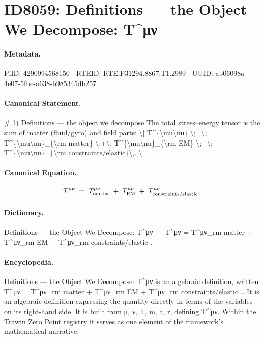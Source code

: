 \section*{ID8059: Definitions — the Object We Decompose: T\textasciicircum{}μν}
\paragraph{Metadata.}
PiID: 4290994568150 | RTEID: RTE:P31294.8867:T1.2989 | UUID: ab06098a-4e07-5fbe-a638-b985345db257

\paragraph{Canonical Statement.}
\# 1) Definitions — the object we decompose The total stress–energy tensor is the sum of matter (fluid/gyro) and field parts: \textbackslash{}[ T\textasciicircum{}\{\textbackslash{}mu\textbackslash{}nu\} \textbackslash{};=\textbackslash{}; T\textasciicircum{}\{\textbackslash{}mu\textbackslash{}nu\}\_\{\textbackslash{}rm matter\} \textbackslash{};+\textbackslash{}; T\textasciicircum{}\{\textbackslash{}mu\textbackslash{}nu\}\_\{\textbackslash{}rm EM\} \textbackslash{};+\textbackslash{}; T\textasciicircum{}\{\textbackslash{}mu\textbackslash{}nu\}\_\{\textbackslash{}rm constraints/elastic\}\textbackslash{},. \textbackslash{}]

\paragraph{Canonical Equation.}
\[
T^{\mu\nu} \;=\; T^{\mu\nu}_{\rm matter} \;+\; T^{\mu\nu}_{\rm EM} \;+\; T^{\mu\nu}_{\rm constraints/elastic}\,.
\]

\paragraph{Dictionary.}
Definitions — the Object We Decompose: T\textasciicircum{}μν — T\textasciicircum{}μν = T\textasciicircum{}μν\_rm matter + T\textasciicircum{}μν\_rm EM + T\textasciicircum{}μν\_rm constraints/elastic .

\paragraph{Encyclopedia.}
Definitions — the Object We Decompose: T\textasciicircum{}μν is an algebraic definition, written T\textasciicircum{}μν = T\textasciicircum{}μν\_rm matter + T\textasciicircum{}μν\_rm EM + T\textasciicircum{}μν\_rm constraints/elastic .. It is an algebraic definition expressing the quantity directly in terms of the variables on its right-hand side. It is built from μ, ν, T, m, a, r, defining T\textasciicircum{}μν. Within the Trawin Zero Point registry it serves as one element of the framework's mathematical narrative.
